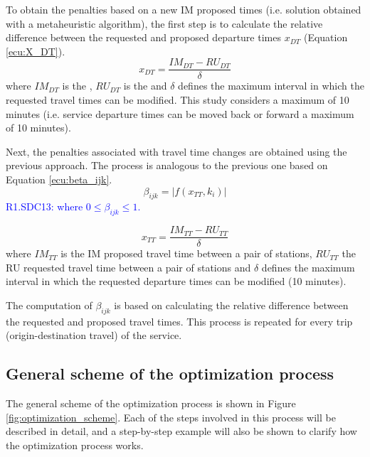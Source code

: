 \documentclass[Afour,sagev,times]{sagej}
\newcommand{\primero}[1]{\textcolor{blue}{#1}}
\begin{document}
To obtain the penalties based on a new \gls{IM} proposed times (i.e. solution obtained with a metaheuristic algorithm), the first step is to calculate the relative difference between the requested and proposed departure times $ x_{DT} $ (Equation \ref{ecu:X_DT}).
\begin{equation}\label{ecu:X_DT}
    x_{DT} = \frac{IM_{DT} - RU_{DT} }{\delta}
\end{equation}
\noindent where $ IM_{DT} $ is the , $ RU_{DT} $ is the  and $ \delta $ defines the maximum interval in which the requested travel times can be modified. This study considers a maximum of 10 minutes (i.e. service departure times can be moved back or forward a maximum of 10 minutes).


Next, the penalties associated with travel time changes are obtained using the previous approach. The process is analogous to the previous one based on Equation \ref{ecu:beta_ijk}.
\begin{equation}\label{ecu:beta_ijk}
    \beta_{ijk} =  |f(x_{TT}, k_i)|
\end{equation}
\noindent \primero{R1.SDC13: where $ 0 \leq \beta_{ijk} \leq 1 $.}

\begin{equation}\label{ecu:X_TT}
    x_{TT} = \frac{IM_{TT} - RU_{TT}}{\delta}
\end{equation}
\noindent where $IM_{TT}$ is the \gls{IM} proposed travel time between a pair of stations, $RU_{TT}$ the \gls{RU} requested travel time between a pair of stations and  $ \delta $ defines the maximum interval in which the requested departure times can be modified (10 minutes).


The computation of $\beta_{ijk}$ is based on calculating the relative difference between the requested and proposed travel times. This process is repeated for every trip (origin-destination travel) of the service.

\subsection{General scheme of the optimization process}
\label{sec:general_scheme}

The general scheme of the optimization process is shown in Figure \ref{fig:optimization_scheme}. Each of the steps involved in this process will be described in detail, and a step-by-step example will also be shown to clarify how the optimization process works.
\end{document}
